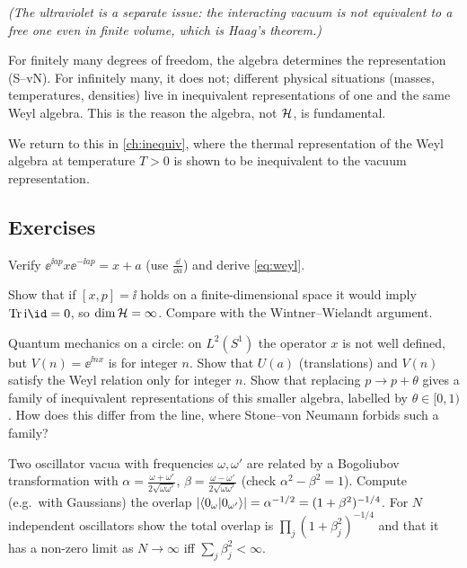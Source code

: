 \emph{(The ultraviolet is a separate issue: the interacting vacuum is not equivalent to a free one even in finite volume, which is Haag's theorem.)}

\begin{keyidea}
For finitely many degrees of freedom, the algebra determines the representation (S--vN). For infinitely many, it does not; different physical situations (masses, temperatures, densities) live in inequivalent representations of one and the same Weyl algebra. This is the reason the algebra, not $\mathcal{H}$, is fundamental.
\end{keyidea}

We return to this in \cref{ch:inequiv}, where the thermal representation of the Weyl algebra at temperature $T>0$ is shown to be inequivalent to the vacuum representation.

\subsection*{Exercises}
\begin{exercise}\label{ex:weyl:1}
Verify $\ee^{\ii ap}x\ee^{-\ii ap}=x+a$ (use $\frac{\dd}{\dd a}$) and derive \eqref{eq:weyl}.
\end{exercise}
\begin{exercise}\label{ex:weyl:2}
Show that if $[x,p]=\ii$ holds on a finite-dimensional space it would imply $\Tr\ii\id=0$, so $\dim\mathcal{H}=\infty$. Compare with the Wintner--Wielandt argument.
\end{exercise}
\begin{exercise}\label{ex:weyl:3}
Quantum mechanics on a circle: on $L^2(S^1)$ the operator $x$ is not well defined, but $V(n)=\ee^{\ii nx}$ is for integer $n$. Show that $U(a)$ (translations) and $V(n)$ satisfy the Weyl relation only for integer $n$. Show that replacing $p\to p+\theta$ gives a family of inequivalent representations of this smaller algebra, labelled by $\theta\in[0,1)$. How does this differ from the line, where Stone--von Neumann forbids such a family?
\end{exercise}
\begin{exercise}\label{ex:weyl:4}
Two oscillator vacua with frequencies $\omega,\omega'$ are related by a Bogoliubov transformation with $\alpha=\frac{\omega+\omega'}{2\sqrt{\omega\omega'}}$, $\beta=\frac{\omega-\omega'}{2\sqrt{\omega\omega'}}$ (check $\alpha^2-\beta^2=1$). Compute (e.g.\ with Gaussians) the overlap $|\langle 0_\omega\vert 0_{\omega'}\rangle|=\alpha^{-1/2}=(1+\beta^2)^{-1/4}$. For $N$ independent oscillators show the total overlap is $\prod_j(1+\beta_j^2)^{-1/4}$ and that it has a non-zero limit as $N\to\infty$ iff $\sum_j\beta_j^2<\infty$.
\end{exercise}


